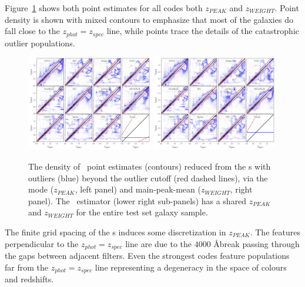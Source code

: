 Figure~\ref{fig:pz_pointestimates} shows both point estimates for all codes  both $z_{PEAK}$ and $z_{WEIGHT}$.
Point density is shown with mixed contours to emphasize that most of the galaxies do fall close to the $z_{phot} = z_{spec}$ line, while points trace the details of the catastrophic outlier populations.

\begin{figure}
\centering
\includegraphics[width=0.49\textwidth]{fig/ZPEAK_szpz_threecolumn_12codes_navy_lowalpha.jpg}
\includegraphics[width=0.49\textwidth]{fig/ZWEIGHT_szpz_threecolumn_12codes_navy_lowalpha.jpg}
\caption{The density of \pz\ point estimates (contours) reduced from the \pzpdf s with outliers (blue) beyond the outlier cutoff (red dashed lines), via the mode ($z_{PEAK}$, left panel) and main-peak-mean ($z_{WEIGHT}$, right panel).
The \trainz\ estimator (lower right sub-panels) has a shared $z_{PEAK}$ and $z_{WEIGHT}$ for the entire test set galaxy sample.}
\label{fig:pz_pointestimates}
\end{figure}

The finite grid spacing of the \pzpdf s induces some discretization in $z_{PEAK}$.
The features perpendicular to the $z_{phot} = z_{spec}$ line are due to the $4000$ \AA break passing through the gaps between adjacent filters.
Even the strongest codes feature populations far from the $z_{phot} = z_{spec}$ line representing a degeneracy in the space of colours and redshifts.


